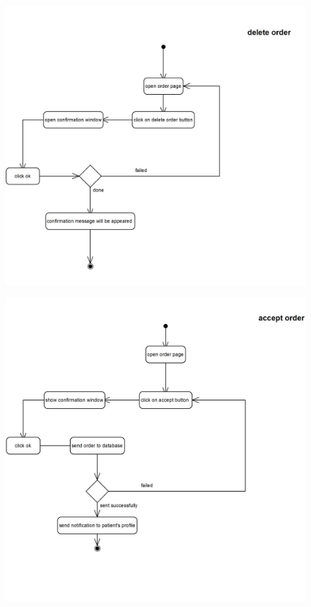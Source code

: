 \documentclass[]{article}
\begin{document}
\begin{figure}[H]
\centering
\includegraphics[scale=0.6]{./activity/10}
\end{figure}
\begin{figure}[H]
\centering
\includegraphics[scale=0.6]{./activity/11}
\end{figure}
\end{document}
